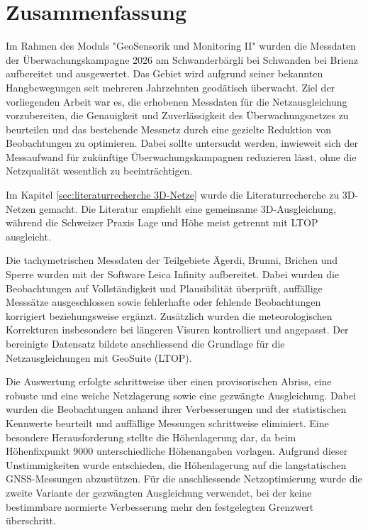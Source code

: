 \clearpage
\section*{Zusammenfassung} 
Im Rahmen des Moduls "GeoSensorik und Monitoring II" wurden die Messdaten
der Überwachungskampagne 2026 am Schwanderbärgli bei Schwanden bei Brienz
aufbereitet und ausgewertet. Das Gebiet wird aufgrund seiner bekannten
Hangbewegungen seit mehreren Jahrzehnten geodätisch überwacht. Ziel der
vorliegenden Arbeit war es, die erhobenen Messdaten für die Netzausgleichung
vorzubereiten, die Genauigkeit und Zuverlässigkeit des Überwachungsnetzes zu
beurteilen und das bestehende Messnetz durch eine gezielte Reduktion von
Beobachtungen zu optimieren. Dabei sollte untersucht werden, inwieweit
sich der Messaufwand für zukünftige Überwachungskampagnen reduzieren lässt,
ohne die Netzqualität wesentlich zu beeinträchtigen. \bigskip

Im Kapitel \ref{sec:literaturrecherche 3D-Netze} wurde die Literaturrecherche
zu 3D-Netzen gemacht. Die Literatur empfiehlt eine gemeinsame 3D-Ausgleichung,
während die Schweizer Praxis Lage und Höhe meist getrennt mit LTOP ausgleicht. \bigskip

Die tachymetrischen Messdaten der Teilgebiete Ägerdi, Brunni,
Brichen und Sperre wurden mit der Software Leica Infinity aufbereitet. Dabei wurden
die Beobachtungen auf Vollständigkeit und Plausibilität überprüft, auffällige
Messsätze ausgeschlossen sowie fehlerhafte oder fehlende Beobachtungen
korrigiert beziehungsweise ergänzt. Zusätzlich wurden die meteorologischen
Korrekturen insbesondere bei längeren Visuren kontrolliert und angepasst.
Der bereinigte Datensatz bildete anschliessend die Grundlage für die
Netzausgleichungen mit GeoSuite (LTOP). \bigskip

Die Auswertung erfolgte schrittweise über einen provisorischen Abriss, eine
robuste und eine weiche Netzlagerung sowie eine gezwängte Ausgleichung.
Dabei wurden die Beobachtungen anhand ihrer Verbesserungen und der
statistischen Kennwerte beurteilt und auffällige Messungen schrittweise
eliminiert. Eine besondere Herausforderung stellte die Höhenlagerung dar,
da beim Höhenfixpunkt 9000 unterschiedliche Höhenangaben vorlagen. Aufgrund
dieser Unstimmigkeiten wurde entschieden, die Höhenlagerung auf die
langstatischen GNSS-Messungen abzustützen. Für die anschliessende
Netzoptimierung wurde die zweite Variante der gezwängten Ausgleichung
verwendet, bei der keine bestimmbare normierte Verbesserung mehr den
festgelegten Grenzwert überschritt. \bigskip

